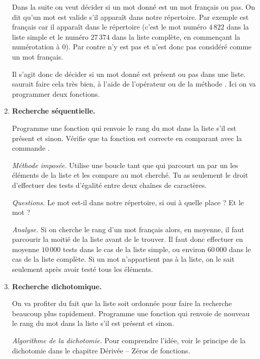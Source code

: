 \documentclass[11pt,class=report,crop=false]{standalone}
\begin{document}
\begin{activite}
\begin{enumerate}
  
  \bigskip
  
  Dans la suite on veut décider si un mot donné est un mot français ou pas. On dit qu'un mot est valide s'il apparaît dans notre répertoire. Par exemple  est français car il apparaît dans le répertoire (c'est le mot numéro $4\,822$ dans la liste simple et le numéro $27\,374$ dans la liste complète, en commençant la numérotation à $0$). Par contre  n'y est pas et n'est donc pas considéré comme un mot français.
  
  Il s'agit donc de décider si un mot donné est présent ou pas dans une liste. \Python{} saurait faire cela très bien, à l'aide de l'opérateur  ou de la méthode . Ici on va programmer deux fonctions.
  
  \item \textbf{Recherche séquentielle.}
  
  Programme une fonction  qui renvoie le rang du mot dans la liste s'il est présent et  sinon. Vérifie que ta fonction est correcte en comparant avec la commande . 
  
  \emph{Méthode imposée.} Utilise une boucle \og{}tant que\fg{} qui parcourt un par un les éléments de la liste et les compare au mot cherché. Tu as seulement le droit d'effectuer des tests d'égalité entre deux chaînes de caractères. 
  
  \emph{Questions.} Le mot  est-il dans notre répertoire, si oui à quelle place ? Et le mot  ?
  
  \emph{Analyse.} Si on cherche le rang d'un mot français alors, en moyenne, il faut parcourir la moitié de la liste avant de le trouver. Il faut donc effectuer en moyenne 
  $10\,000$ tests dans le cas de la liste simple, ou environ $60\,000$ dans le cas de la liste complète. Si un mot n'appartient pas à la liste, on le sait seulement après avoir testé tous les éléments.
  
  

  \item \textbf{Recherche dichotomique.}
  
  On va profiter du fait que la liste soit ordonnée pour faire la recherche beaucoup plus rapidement.   
  Programme une fonction  qui renvoie de nouveau le rang du mot dans la liste s'il est présent et  sinon. 
  
  \emph{Algorithme de la dichotomie.} Pour comprendre l'idée, voir le principe de la dichotomie dans le chapitre \og{}Dérivée -- Zéros de fonctions\fg{}.
  

\end{enumerate}
\end{activite}
\end{document}
